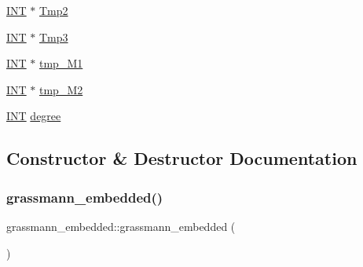 \begin{DoxyCompactItemize}
\item 
\mbox{\hyperlink{galois_8h_a09fddde158a3a20bd2dcadb609de11dc}{I\+NT}} $\ast$ \mbox{\hyperlink{classgrassmann__embedded_af4eb8c975bd1e96bf4b2e4cff11570a1}{Tmp2}}
\item 
\mbox{\hyperlink{galois_8h_a09fddde158a3a20bd2dcadb609de11dc}{I\+NT}} $\ast$ \mbox{\hyperlink{classgrassmann__embedded_a840e7e1f37246c3d3dfa77f9b19c4662}{Tmp3}}
\item 
\mbox{\hyperlink{galois_8h_a09fddde158a3a20bd2dcadb609de11dc}{I\+NT}} $\ast$ \mbox{\hyperlink{classgrassmann__embedded_a18d6a159cb6597e071c39d703f93fac1}{tmp\+\_\+\+M1}}
\item 
\mbox{\hyperlink{galois_8h_a09fddde158a3a20bd2dcadb609de11dc}{I\+NT}} $\ast$ \mbox{\hyperlink{classgrassmann__embedded_ad28ba8e895257e4f8d7dfa9c0cc80932}{tmp\+\_\+\+M2}}
\item 
\mbox{\hyperlink{galois_8h_a09fddde158a3a20bd2dcadb609de11dc}{I\+NT}} \mbox{\hyperlink{classgrassmann__embedded_a3975bf60f089f9671a9b615db66f65f1}{degree}}
\end{DoxyCompactItemize}


\subsection{Constructor \& Destructor Documentation}
\mbox{\label{classgrassmann__embedded_a480bffd75365db05623d252eb2e78544}} 
\subsubsection{\texorpdfstring{grassmann\+\_\+embedded()}{grassmann\_embedded()}}
{\footnotesize\ttfamily grassmann\+\_\+embedded\+::grassmann\+\_\+embedded (\begin{DoxyParamCaption}{ }\end{DoxyParamCaption})}

\mbox{\label{classgrassmann__embedded_a724c69423ffb0bef8d03a422807a84cc}} 

